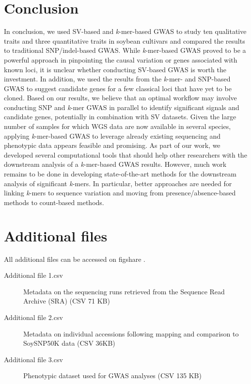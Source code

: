 \section*{Conclusion}

In conclusion, we used SV-based and \emph{k}-mer-based GWAS to study ten
qualitative traits and three quantitative traits in soybean cultivars and
compared the results to traditional SNP/indel-based GWAS. While
\emph{k}-mer-based GWAS proved to be a powerful approach in pinpointing the
causal variation or genes associated with known loci, it is unclear whether
conducting SV-based GWAS is worth the investment. In addition, we used the
results from the \emph{k}-mer- and SNP-based GWAS to suggest candidate genes
for a few classical loci that have yet to be cloned. Based on our results, we
believe that an optimal workflow may involve conducting SNP and \emph{k}-mer
GWAS in parallel to identify significant signals and candidate genes,
potentially in combination with SV datasets. Given the large
number of samples for which WGS data are now available in several species,
applying \emph{k}-mer-based GWAS to leverage already existing sequencing and
phenotypic data appears feasible and promising. As part of our work, we
developed several computational tools that should help other researchers with the downstream
analysis of a \emph{k}-mer-based GWAS results. However, much work
remains to be done in developing state-of-the-art methods for the downstream
analysis of significant \emph{k}-mers. In particular, better approaches are
needed for linking \emph{k}-mers to sequence variation and moving from
presence/absence-based methods to count-based methods.

\section*{Additional files}
\label{sv-gwas-additional-files}

All additional files can be accessed on figshare \citep{kmer-gwas-figshare}.

\begin{description}
	\item[Additional file 1.csv] Metadata on the sequencing runs retrieved
		from the Sequence Read Archive (SRA) (CSV 71 KB)
	\item[Additional file 2.csv] Metadata on individual accessions following mapping
		and comparison to SoySNP50K data (CSV 36KB)
	\item[Additional file 3.csv] Phenotypic dataset used for GWAS analyses (CSV 135
		KB)
\end{description}

